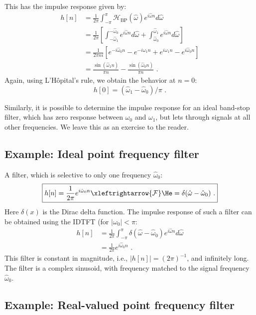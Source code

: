 This has the impulse response given by:
\begin{align}
h[n] &= \frac{1}{2\pi}\int_{-\pi}^{\pi} \mathcal{H}_{\mathrm{BP}}(\hat{\omega}) e^{i\hat{\omega}n} d\hat{\omega}\\
&=\frac{1}{2\pi}\left[\int_{-\hat{\omega}_1}^{-\hat{\omega}_0} e^{i\hat{\omega}n} d\hat{\omega} + \int_{\hat{\omega}_0}^{\hat{\omega}_1} e^{i\hat{\omega}n} d\hat{\omega} \right]\\
&=\frac{1}{2\pi ni}\left[ e^{-i\hat{\omega}_0 n} - e^{-i\omega_1 n} + e^{i\omega_1 n} - e^{i\hat{\omega}_0 n} \right]\\
&= \frac{\sin(\hat{\omega}_1 n)}{\pi n}-\frac{\sin(\hat{\omega}_0 n)}{\pi n}\,\,.
\end{align}
Again, using L'H\^opital's rule, we obtain the behavior at $n=0$:
\begin{equation}
h[0]=(\hat{\omega}_1 - \hat{\omega}_0)/\pi\,\,.
\end{equation}

Similarly, it is possible to determine the impulse response for
an ideal band-stop filter, which has zero response between $\omega_0$
and $\omega_1$, but lets through signals at all other frequencies. We
leave this as an exercise to the reader.

\subsection{Example: Ideal point frequency filter}
\label{pointfreq}

A filter, which is selective to only one frequency $\hat{\omega}_0$:
\begin{equation}
  \boxed{
    h[n]=\frac{1}{2\pi} e^{i\hat{\omega}_0 n} \xleftrightarrow{\mathcal{F}} \He = \delta(\hat{\omega}-\hat{\omega}_0)\,\,.
    }
\end{equation}
Here $\delta(x)$ is the Dirac delta function. The impulse response of
such a filter can be obtained using the IDTFT (for $|\omega_{0}|<\pi$:
\begin{align}
h[n]&=\frac{1}{2\pi}\int_{-\pi}^{\pi} \delta(\hat{\omega}-\hat{\omega}_0) e^{i\hat{\omega}n} d\hat{\omega}\\
&= \frac{1}{2\pi} e^{i\hat{\omega}_0 n}\,\,.
\end{align}
This filter is constant in magnitude, i.e., $|h[n]|=(2\pi)^{-1}$, and
infinitely long. The filter is a complex sinusoid, with frequency
matched to the signal frequency $\hat{\omega}_0$.

\subsection{Example: Real-valued point frequency filter}

